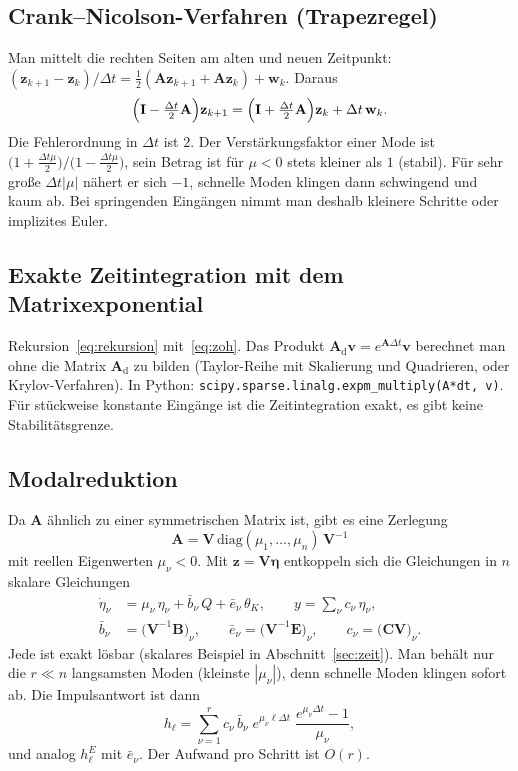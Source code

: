 \documentclass[11pt,a4paper]{article}
\numberwithin{equation}{section}
\newcommand{\dt}{\Delta t}
\newcommand{\thK}{\theta_{K}}
\newcommand{\mA}{\mathbf{A}}
\newcommand{\mB}{\mathbf{B}}
\newcommand{\mE}{\mathbf{E}}
\newcommand{\mC}{\mathbf{C}}
\newcommand{\mI}{\mathbf{I}}
\newcommand{\mAd}{\mathbf{A}_{\mathrm d}}
\newcommand{\vz}{\mathbf{z}}
\newcommand{\vv}{\mathbf{v}}
\begin{document}
\subsection{Crank--Nicolson-Verfahren (Trapezregel)}

Man mittelt die rechten Seiten am alten und neuen Zeitpunkt: $(\vz_{k+1}-\vz_k)/\dt=\tfrac12(\mA\vz_{k+1}+\mA\vz_k)+\mathbf w_k$. Daraus
\begin{equation}
 \Bigl(\mI-\tfrac{\dt}{2}\mA\Bigr)\vz_{k+1}=\Bigl(\mI+\tfrac{\dt}{2}\mA\Bigr)\vz_k+\dt\,\mathbf w_k.
\end{equation}
Die Fehlerordnung in $\dt$ ist $2$. Der Verstärkungsfaktor einer Mode ist $\bigl(1+\tfrac{\dt\mu}{2}\bigr)/\bigl(1-\tfrac{\dt\mu}{2}\bigr)$, sein Betrag ist für $\mu<0$ stets kleiner als $1$ (stabil). Für sehr große $\dt|\mu|$ nähert er sich $-1$, schnelle Moden klingen dann schwingend und kaum ab. Bei springenden Eingängen nimmt man deshalb kleinere Schritte oder implizites Euler.

\subsection{Exakte Zeitintegration mit dem Matrixexponential}

Rekursion~\eqref{eq:rekursion} mit~\eqref{eq:zoh}. Das Produkt $\mAd\vv=e^{\mA\dt}\vv$ berechnet man ohne die Matrix $\mAd$ zu bilden (Taylor-Reihe mit Skalierung und Quadrieren, oder Krylov-Verfahren). In Python: \texttt{scipy.sparse.linalg.expm\_multiply(A*dt, v)}. Für stückweise konstante Eingänge ist die Zeitintegration exakt, es gibt keine Stabilitätsgrenze.

\subsection{Modalreduktion}

Da $\mA$ ähnlich zu einer symmetrischen Matrix ist, gibt es eine Zerlegung
\begin{equation*}
 \mA=\mathbf V\,\mathrm{diag}(\mu_1,\dots,\mu_n)\,\mathbf V^{-1}
\end{equation*}
mit reellen Eigenwerten $\mu_\nu<0$. Mit $\vz=\mathbf V\symbf{\eta}$ entkoppeln sich die Gleichungen in $n$ skalare Gleichungen
\begin{align}
 \dot\eta_\nu&=\mu_\nu\,\eta_\nu+\bar b_\nu\,Q+\bar e_\nu\,\thK,\qquad y=\sum_\nu c_\nu\,\eta_\nu,\\
 \bar b_\nu&=\bigl(\mathbf V^{-1}\mB\bigr)_\nu,\qquad \bar e_\nu=\bigl(\mathbf V^{-1}\mE\bigr)_\nu,\qquad c_\nu=\bigl(\mC\mathbf V\bigr)_\nu .
\end{align}
Jede ist exakt lösbar (skalares Beispiel in Abschnitt~\ref{sec:zeit}). Man behält nur die $r\ll n$ langsamsten Moden (kleinste $|\mu_\nu|$), denn schnelle Moden klingen sofort ab. Die Impulsantwort ist dann
\begin{equation}
 h_\ell=\sum_{\nu=1}^{r}c_\nu\,\bar b_\nu\;e^{\mu_\nu\ell\dt}\;\frac{e^{\mu_\nu\dt}-1}{\mu_\nu},
\end{equation}
und analog $h^E_\ell$ mit $\bar e_\nu$. Der Aufwand pro Schritt ist $O(r)$.
\end{document}
